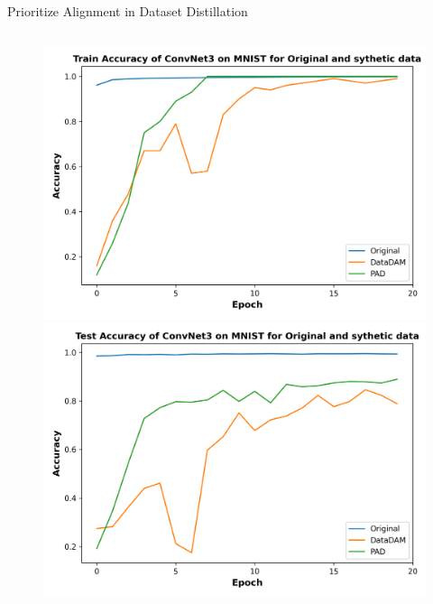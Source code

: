 \documentclass[final]{beamer}
\newlength{\colwidth}
\begin{document}
\begin{columns}
\begin{column}{\colwidth}
\begin{block}{Prioritize Alignment in Dataset Distillation}
\begin{columns}
			\end{columns}
			
			\begin{figure}[ht]
				\centering
				\begin{minipage}{0.48\textwidth}
					\centering
					\includegraphics[width=\textwidth]{../report/figures/train_acc_task2.png}
					
				\end{minipage}
				\hfill
				\begin{minipage}{0.48\textwidth}
					\centering
					\includegraphics[width=\textwidth]{../report/figures/test_acc_task2.png}
					
				\end{minipage}
				

\end{figure}
\end{block}
\end{column}
\end{columns}
\end{document}
